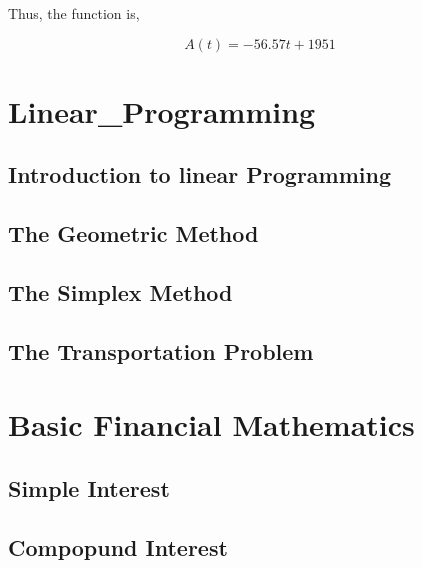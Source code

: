 \documentclass[
  letterpaper,
  DIV=11,
  numbers=noendperiod]{scrreprt}
\begin{document}
Thus, the function is,

\[A(t)=-56.57t + 1951\]


\hypertarget{linear_programming}{%
\chapter{Linear\_Programming}\label{linear_programming}}

\hypertarget{introduction-to-linear-programming}{%
\section{Introduction to linear
Programming}\label{introduction-to-linear-programming}}

\hypertarget{the-geometric-method}{%
\section{The Geometric Method}\label{the-geometric-method}}

\hypertarget{the-simplex-method}{%
\section{The Simplex Method}\label{the-simplex-method}}

\hypertarget{the-transportation-problem}{%
\section{The Transportation Problem}\label{the-transportation-problem}}


\hypertarget{basic-financial-mathematics}{%
\chapter{Basic Financial
Mathematics}\label{basic-financial-mathematics}}

\hypertarget{simple-interest}{%
\section{Simple Interest}\label{simple-interest}}

\hypertarget{compopund-interest}{%
\section{Compopund Interest}\label{compopund-interest}}
\end{document}
